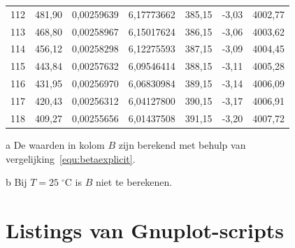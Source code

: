 \documentclass[12pt,a4paper,final,twoside,fleqn]{article}
\newcommand{\mathcelc}[1]{\mbox{$#1\;^\circ\text{C}$}}
\begin{document}
\begin{ThreePartTable}
\begin{longtable}{rrrrrrr}
112          & 481,90    & 0,00259639    & 6,17773662  & 385,15     & -3,03      & 4002,77 \\
113          & 468,80    & 0,00258967    & 6,15017624  & 386,15     & -3,06      & 4003,62 \\
114          & 456,12    & 0,00258298    & 6,12275593  & 387,15     & -3,09      & 4004,45 \\
115          & 443,84    & 0,00257632    & 6,09546414  & 388,15     & -3,11      & 4005,28 \\
116          & 431,95    & 0,00256970    & 6,06830984  & 389,15     & -3,14      & 4006,09 \\
117          & 420,43    & 0,00256312    & 6,04127800  & 390,15     & -3,17      & 4006,91 \\
118          & 409,27    & 0,00255656    & 6,01437508  & 391,15     & -3,20      & 4007,72 \\
\end{longtable}
\begin{tablenotes}
\footnotesize
\item [a] De waarden in kolom $B$ zijn berekend met behulp van vergelijking~\eqref{equ:betaexplicit}.
\item [b] Bij $T=\mathcelc{25}$ is $B$ niet te berekenen.
\end{tablenotes}
\end{ThreePartTable}

\clearpage
\section{Listings van Gnuplot-scripts}

\label{app:ntc_shh_kelvin}

\newpage
\label{app:ntc_shh_straightline_beta}

\newpage
\label{app:ntc_shh_straightline_adapt}





\end{document}
